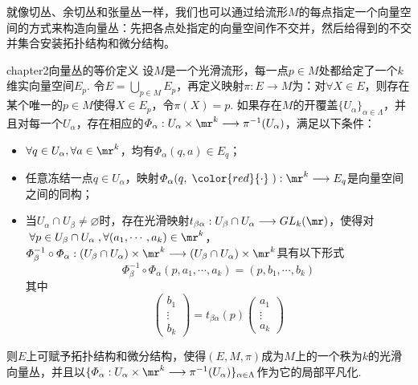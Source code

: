 就像切丛、余切丛和张量丛一样，我们也可以通过给流形$M$的每点指定一个向量空间的方式来构造向量丛：先把各点处指定的向量空间作不交并，然后给得到的不交并集合安装拓扑结构和微分结构。
\begin{mythm}{}{chapter2向量丛的等价定义}
	设$M$是一个光滑流形，每一点$p\in M$处都给定了一个$k$维实向量空间$E_{p}$. 令$E=\bigcup\limits_{p\in M}E_{p}$，再定义映射$\pi:E\longrightarrow M$为：对$\forall X\in E$，则存在某个唯一的$p\in M$使得$X\in E_{p}$，令$\pi(X)=p$. 如果存在$M$的开覆盖$\{U_{\alpha} \}_{\alpha\in \Lambda}$，并且对每一个$U_{\alpha}$，存在相应的{\color{red}{双射}}$\varPhi_{\alpha}:U_{\alpha}\times \mr^{k}\longrightarrow \pi^{-1}(U_{\alpha})$，满足以下条件：
	\begin{itemize}
		\item[(1)] $\forall q\in U_{\alpha},\forall a\in \mr^{k}$，均有$\varPhi_{\alpha}(q,a)\in E_{q}$；
		\item[(2)]  任意冻结一点$q\in U_{\alpha}$，映射$\varPhi_{\alpha}(q,\;{\color{red}{\cdot}}\;): \mr^{k}\longrightarrow E_{q}$是向量空间之间的同构；
		\item[(3)] 当$U_{\alpha}\cap U_{\beta}\neq\varnothing$时，存在光滑映射$t_{\beta\alpha}:U_{\beta}\cap U_{\alpha}\longrightarrow GL_{k}(\mr)$，使得对$\;\forall p\in U_{\beta}\cap U_{\alpha}\;,\forall(a_{1},\cdots,a_{k})\in \mr^{k}$，$\varPhi_{\beta}^{-1}\circ\varPhi_{\alpha}:(U_{\beta}\cap U_{\alpha})\times\mr^{k}\longrightarrow (U_{\beta}\cap U_{\alpha})\times\mr^{k}$具有以下形式
		\[
		\varPhi_{\beta}^{-1}\circ\varPhi_{\alpha}(p,a_{1},\cdots,a_{k})=(p,b_{1},\cdots,b_{k})
		\]
		其中
		\[
		\left( \begin{array}{ccc}{b_{1}} \\ {\vdots}  \\ {b_{k}} \end{array}\right)=t_{\beta\alpha}(p) \left( \begin{array}{ccc}{a_{1}} \\ {\vdots}  \\ {a_{k}} \end{array}\right)
		\]
	\end{itemize}
	则$E$上可赋予拓扑结构和微分结构，使得$(E,M,\pi)$成为$M$上的一个秩为$k$的光滑向量丛，并且以$\{\varPhi_{\alpha}:U_{\alpha}\times \mr^{k}\longrightarrow \pi^{-1}(U_{\alpha}) \}_{\alpha\in \Lambda}$作为它的局部平凡化.
\end{mythm}

